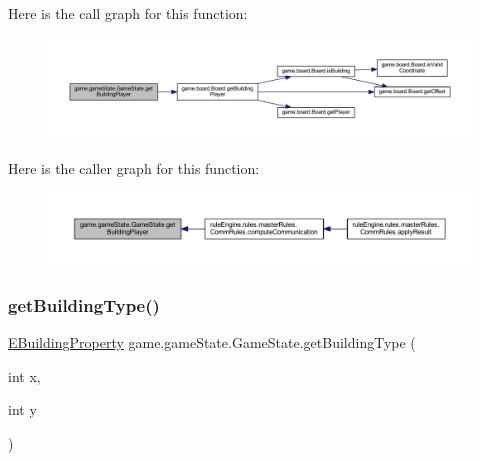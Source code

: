 Here is the call graph for this function\+:
\nopagebreak
\begin{figure}[H]
\begin{center}
\leavevmode
\includegraphics[width=350pt]{classgame_1_1game_state_1_1_game_state_a25ae413bd0f2d04b162673431975ec8f_cgraph}
\end{center}
\end{figure}
Here is the caller graph for this function\+:
\nopagebreak
\begin{figure}[H]
\begin{center}
\leavevmode
\includegraphics[width=350pt]{classgame_1_1game_state_1_1_game_state_a25ae413bd0f2d04b162673431975ec8f_icgraph}
\end{center}
\end{figure}
\mbox{\label{classgame_1_1game_state_1_1_game_state_a2d95887f3ee78109ddcb0b27b6a8ec93}} 
\subsubsection{\texorpdfstring{get\+Building\+Type()}{getBuildingType()}}
{\footnotesize\ttfamily \mbox{\hyperlink{enumrule_engine_1_1entity_1_1_e_building_property}{E\+Building\+Property}} game.\+game\+State.\+Game\+State.\+get\+Building\+Type (\begin{DoxyParamCaption}\item[{int}]{x,  }\item[{int}]{y }\end{DoxyParamCaption})\hspace{0.3cm}{\ttfamily [inline]}}

